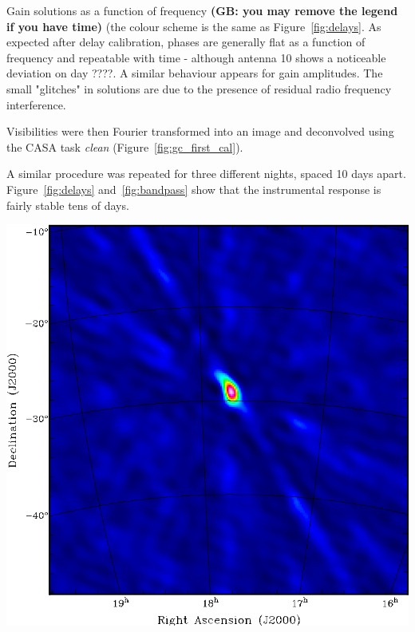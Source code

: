 \documentclass[a0,portrait]{a0poster}
\begin{document}
\begin{multicols}{2}
\begin{minipage}{\columnwidth}
{    }\qquad%
    \caption{Gain solutions as a function of frequency {\bf (GB: you may remove the legend if you have time)} (the colour scheme is the same as Figure~\ref{fig:delays}. As expected after delay calibration, phases are generally flat as a function of frequency and repeatable with time - although antenna 10 shows a noticeable deviation on day ????. A similar behaviour appears for gain amplitudes. The small "glitches" in solutions are due to the presence of residual radio frequency interference.}
\label{fig:bandpass}
  \end{minipage}

Visibilities were then Fourier transformed into an image and deconvolved using the CASA task {\it clean} (Figure~\ref{fig:gc_first_cal}).

A similar procedure was repeated for three different nights, spaced 10 days apart. Figure~\ref{fig:delays} and~\ref{fig:bandpass} show that the instrumental response is fairly stable tens of days.

\begin{center}\vspace{1cm}
\includegraphics[width=0.4\linewidth]{gc_first_cal.png}
\label{fig:gc_first_cal}
\end{center}\vspace{1cm}




\end{multicols}
\end{document}
